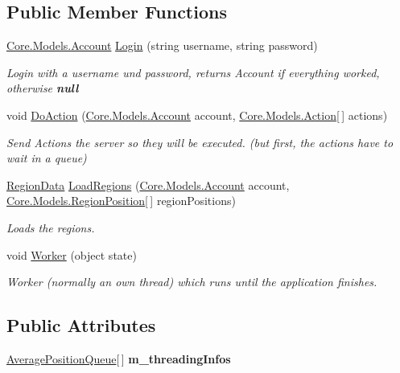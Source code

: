 \subsection*{Public Member Functions}
\begin{DoxyCompactItemize}
\item 
\hyperlink{classCore_1_1Models_1_1Account}{Core.\-Models.\-Account} \hyperlink{classServer_1_1Controllers_1_1APIController_a00ed79b2c42e5c4f39319c38fc492b32}{Login} (string username, string password)
\begin{DoxyCompactList}\small\item\em Login with a username und password, returns Account if everything worked, otherwise {\bfseries null} \end{DoxyCompactList}\item 
void \hyperlink{classServer_1_1Controllers_1_1APIController_abca86085e8c85b2f94b0a95e47a89add}{Do\-Action} (\hyperlink{classCore_1_1Models_1_1Account}{Core.\-Models.\-Account} account, \hyperlink{classCore_1_1Models_1_1Action}{Core.\-Models.\-Action}\mbox{[}$\,$\mbox{]} actions)
\begin{DoxyCompactList}\small\item\em Send Actions the server so they will be executed. (but first, the actions have to wait in a queue) \end{DoxyCompactList}\item 
\hyperlink{classServer_1_1Controllers_1_1APIController_1_1RegionData}{Region\-Data} \hyperlink{classServer_1_1Controllers_1_1APIController_a109e88f8d8e2006aa6408ae775779864}{Load\-Regions} (\hyperlink{classCore_1_1Models_1_1Account}{Core.\-Models.\-Account} account, \hyperlink{classCore_1_1Models_1_1RegionPosition}{Core.\-Models.\-Region\-Position}\mbox{[}$\,$\mbox{]} region\-Positions)
\begin{DoxyCompactList}\small\item\em Loads the regions. \end{DoxyCompactList}\item 
void \hyperlink{classServer_1_1Controllers_1_1APIController_ab0452ab5e12d38f778cc5db9b41bb3a0}{Worker} (object state)
\begin{DoxyCompactList}\small\item\em Worker (normally an own thread) which runs until the application finishes. \end{DoxyCompactList}\end{DoxyCompactItemize}
\subsection*{Public Attributes}
\begin{DoxyCompactItemize}
\item 
\hypertarget{classServer_1_1Controllers_1_1APIController_aee12d29edee563a727c2309ffe94ed1c}{\hyperlink{classServer_1_1Controllers_1_1APIController_1_1AveragePositionQueue}{Average\-Position\-Queue}\mbox{[}$\,$\mbox{]} {\bfseries m\-\_\-threading\-Infos}}\label{classServer_1_1Controllers_1_1APIController_aee12d29edee563a727c2309ffe94ed1c}

\end{DoxyCompactItemize}
